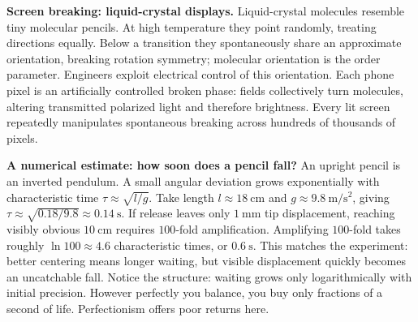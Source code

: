 \begin{mainline}
\textbf{Screen breaking: liquid-crystal displays.} Liquid-crystal molecules resemble tiny molecular pencils. At high temperature they point randomly, treating directions equally. Below a transition they spontaneously share an approximate orientation, breaking rotation symmetry; molecular orientation is the order parameter. Engineers exploit electrical control of this orientation. Each phone pixel is an artificially controlled broken phase: fields collectively turn molecules, altering transmitted polarized light and therefore brightness. Every lit screen repeatedly manipulates spontaneous breaking across hundreds of thousands of pixels.
\end{mainline}

\begin{center}
\end{center}

\begin{mainline}
\textbf{A numerical estimate: how soon does a pencil fall?} An upright pencil is an inverted pendulum. A small angular deviation grows exponentially with characteristic time \(\tau\approx\sqrt{l/g}\). Take length \(l\approx 18\ \mathrm{cm}\) and \(g\approx 9.8\ \mathrm{m/s^{2}}\), giving \(\tau\approx\sqrt{0.18/9.8}\approx 0.14\ \mathrm{s}\). If release leaves only \(1\ \mathrm{mm}\) tip displacement, reaching visibly obvious \(10\ \mathrm{cm}\) requires \(100\)-fold amplification. Amplifying \(100\)-fold takes roughly \(\ln 100\approx 4.6\) characteristic times, or \(0.6\ \mathrm{s}\). This matches the experiment: better centering means longer waiting, but visible displacement quickly becomes an uncatchable fall. Notice the structure: waiting grows only logarithmically with initial precision. However perfectly you balance, you buy only fractions of a second of life. Perfectionism offers poor returns here.
\end{mainline}

